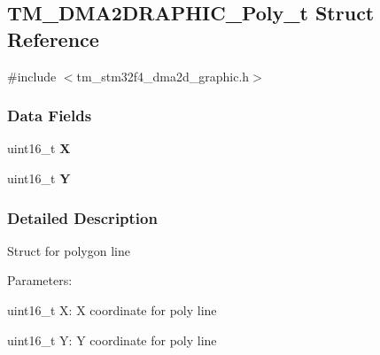 \hypertarget{struct_t_m___d_m_a2_d_r_a_p_h_i_c___poly__t}{}\subsection{T\+M\+\_\+\+D\+M\+A2\+D\+R\+A\+P\+H\+I\+C\+\_\+\+Poly\+\_\+t Struct Reference}
\label{struct_t_m___d_m_a2_d_r_a_p_h_i_c___poly__t}


{\ttfamily \#include $<$tm\+\_\+stm32f4\+\_\+dma2d\+\_\+graphic.\+h$>$}

\subsubsection*{Data Fields}
\begin{DoxyCompactItemize}
\item 
\hypertarget{struct_t_m___d_m_a2_d_r_a_p_h_i_c___poly__t_a60eb5e8306eb4f0eaa95ff5d16651e35}{}uint16\+\_\+t {\bfseries X}\label{struct_t_m___d_m_a2_d_r_a_p_h_i_c___poly__t_a60eb5e8306eb4f0eaa95ff5d16651e35}

\item 
\hypertarget{struct_t_m___d_m_a2_d_r_a_p_h_i_c___poly__t_a50e294f91c22925f629a1a4a3507145c}{}uint16\+\_\+t {\bfseries Y}\label{struct_t_m___d_m_a2_d_r_a_p_h_i_c___poly__t_a50e294f91c22925f629a1a4a3507145c}

\end{DoxyCompactItemize}


\subsubsection{Detailed Description}
Struct for polygon line

Parameters\+:
\begin{DoxyItemize}
\item uint16\+\_\+t X\+: X coordinate for poly line
\item uint16\+\_\+t Y\+: Y coordinate for poly line 
\end{DoxyItemize}